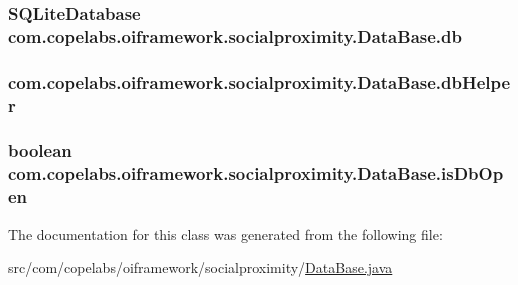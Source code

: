 \subsubsection[{db}]{\setlength{\rightskip}{0pt plus 5cm}S\+Q\+Lite\+Database com.\+copelabs.\+oiframework.\+socialproximity.\+Data\+Base.\+db\hspace{0.3cm}{\ttfamily [private]}}\label{classcom_1_1copelabs_1_1oiframework_1_1socialproximity_1_1_data_base_a5f830f25de42020143a3481e4c687037}
\hypertarget{classcom_1_1copelabs_1_1oiframework_1_1socialproximity_1_1_data_base_a4cb37e38a2ceb667978d5f28bfb199ae}{}
\subsubsection[{db\+Helper}]{ com.\+copelabs.\+oiframework.\+socialproximity.\+Data\+Base.\+db\+Helper\hspace{0.3cm}{\ttfamily [private]}}\label{classcom_1_1copelabs_1_1oiframework_1_1socialproximity_1_1_data_base_a4cb37e38a2ceb667978d5f28bfb199ae}
\hypertarget{classcom_1_1copelabs_1_1oiframework_1_1socialproximity_1_1_data_base_abd8a8b73edfc93d99b10439733273220}{}
\subsubsection[{is\+Db\+Open}]{\setlength{\rightskip}{0pt plus 5cm}boolean com.\+copelabs.\+oiframework.\+socialproximity.\+Data\+Base.\+is\+Db\+Open\hspace{0.3cm}{\ttfamily [private]}}\label{classcom_1_1copelabs_1_1oiframework_1_1socialproximity_1_1_data_base_abd8a8b73edfc93d99b10439733273220}


The documentation for this class was generated from the following file\+:\begin{DoxyCompactItemize}
\item 
src/com/copelabs/oiframework/socialproximity/\hyperlink{_data_base_8java}{Data\+Base.\+java}\end{DoxyCompactItemize}
